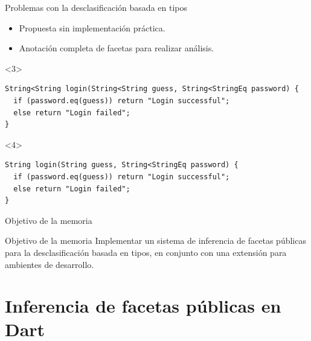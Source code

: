 \documentclass[aspectratio=169,10pt]{beamer}
\begin{document}
\begin{frame}[fragile]{Problemas con la desclasificación basada en tipos}
	\begin{itemize} \pause
		\item Propuesta sin implementación práctica. \pause
		\item Anotación completa de facetas para realizar análisis. \pause
	\end{itemize}
	\vspace{1cm}
	\begin{onlyenv}
\begin{lstlisting}[basicstyle=\fontsize{9}{9}\ttfamily]
String<String login(String<String guess, String<StringEq password) {
  if (password.eq(guess)) return "Login successful";
  else return "Login failed";
}
\end{lstlisting}

	\end{onlyenv}
	\begin{onlyenv}
\begin{lstlisting}[basicstyle=\fontsize{9}{9}\ttfamily]
String login(String guess, String<StringEq password) {
  if (password.eq(guess)) return "Login successful";
  else return "Login failed";
}
\end{lstlisting}

	\end{onlyenv}
\end{frame}

\begin{frame}[fragile]{Objetivo de la memoria}
	\begin{block}{Objetivo de la memoria}
		Implementar un sistema de inferencia de facetas públicas para la desclasificación basada en tipos, en conjunto con una extensión para ambientes de desarrollo.
	\end{block}
\end{frame}

\section{Inferencia de facetas públicas en Dart}
\end{document}

